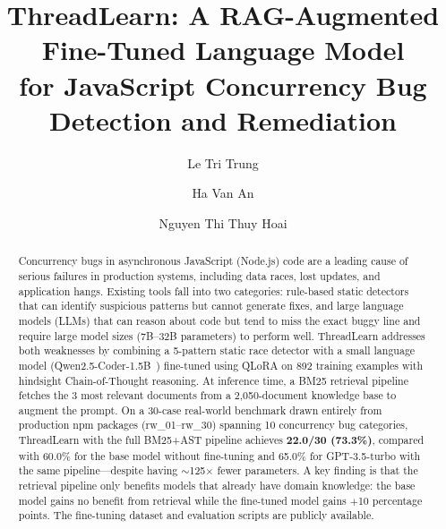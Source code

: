 \documentclass[runningheads]{llncs}
\begin{document}
\title{ThreadLearn: A RAG-Augmented Fine-Tuned Language Model\\
       for JavaScript Concurrency Bug Detection and Remediation}


\author{Le Tri Trung \and
        Ha Van An \and
        Nguyen Thi Thuy Hoai}



\maketitle

\begin{abstract}
Concurrency bugs in asynchronous JavaScript (Node.js) code are a leading
cause of serious failures in production systems, including data races,
lost updates, and application hangs.
Existing tools fall into two categories: rule-based static detectors that
can identify suspicious patterns but cannot generate fixes, and large
language models (LLMs) that can reason about code but tend to miss the
exact buggy line and require large model sizes (7B--32B parameters) to
perform well.
ThreadLearn addresses both weaknesses by combining a 5-pattern static
race detector with a small language model (Qwen2.5-Coder-1.5B~\cite{qwen25coder}) fine-tuned
using QLoRA on 892 training examples with hindsight Chain-of-Thought
reasoning.
At inference time, a BM25 retrieval pipeline fetches the 3 most relevant
documents from a 2,050-document knowledge base to augment the prompt.
On a 30-case real-world benchmark drawn entirely from production npm packages
(rw\_01--rw\_30) spanning 10 concurrency bug categories, ThreadLearn with
the full BM25+AST pipeline achieves \textbf{22.0/30 (73.3\%)},
compared with 60.0\% for the base model without fine-tuning and 65.0\% for
GPT-3.5-turbo with the same pipeline---despite having $\sim$125$\times$
fewer parameters.
A key finding is that the retrieval pipeline only benefits models that
already have domain knowledge: the base model gains no benefit from retrieval
while the fine-tuned model gains $+$10 percentage points.
The fine-tuning dataset and evaluation scripts are publicly available.

\end{abstract}
\end{document}
